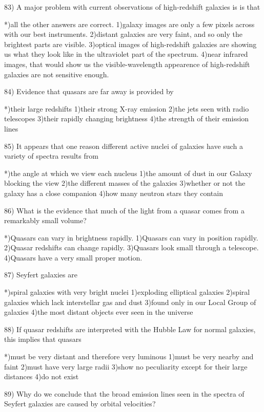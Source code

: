 83) A major problem with current observations of high-redshift galaxies is
    is that
 
 *)all the other answers are correct.
 1)galaxy images are only a few pixels across with our best instruments.
 2)distant galaxies are very faint, and so only the brightest parts are
   visible.
 3)optical images of high-redshift galaxies are showing us what they
   look like in the ultraviolet part of the spectrum.
 4)near infrared images, that would show us the visible-wavelength
   appearence of high-redshift galaxies are not sensitive enough.
 
84) Evidence that quasars are far away is provided by
 
 *)their large redshifts
 1)their strong X-ray emission
 2)the jets seen with radio telescopes
 3)their rapidly changing brightness
 4)the strength of their emission lines
 
85) It appears that one reason different active nuclei of galaxies have
    such a variety of spectra results from
 
 *)the angle at which we view each nucleus
 1)the amount of dust in our Galaxy blocking the view
 2)the different masses of the galaxies
 3)whether or not the galaxy has a close companion
 4)how many neutron stars they contain
 
86) What is the evidence that much of the light from a quasar comes
    from a remarkably small volume?
 
 *)Quasars can vary in brightness rapidly.
 1)Quasars can vary in position rapidly.
 2)Quasar redshifts can change rapidly.
 3)Quasars look small through a telescope.
 4)Quasars have a very small proper motion.
 
87) Seyfert galaxies are
 
 *)spiral galaxies with very bright nuclei
 1)exploding elliptical galaxies
 2)spiral galaxies which lack interstellar gas and dust
 3)found only in our Local Group of galaxies
 4)the most distant objects ever seen in the universe
 
88) If quasar redshifts are interpreted with the Hubble Law for normal
    galaxies, this implies that quasars
 
 *)must be very distant and therefore very luminous
 1)must be very nearby and faint
 2)must have very large radii
 3)show no peculiarity except for their large distances
 4)do not exist
 
89) Why do we conclude that the broad emission lines seen in the spectra
    of Seyfert galaxies are caused by orbital velocities?
 
